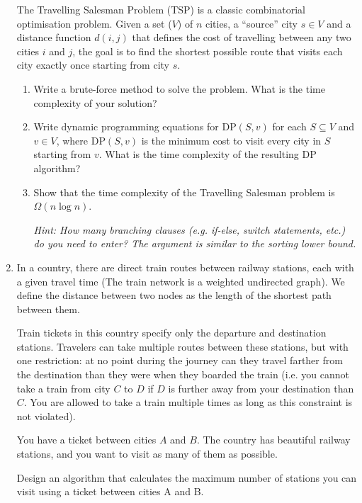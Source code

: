 \documentclass{article}
\begin{document}
\begin{enumerate}
The Travelling Salesman Problem (TSP) is a classic combinatorial optimisation problem. Given a set ($V$) of $n$ cities, a ``source'' city $s\in V$ and a distance function $d(i, j)$ that defines the cost of travelling between any two cities $i$ and $j$, the goal is to find the shortest possible route that visits each city exactly once starting from city $s$.
\begin{enumerate}
    \item Write a brute-force method to solve the problem. What is the time complexity of your solution?
    \item Write dynamic programming equations for $\mathrm{DP}(S,v)$ for each $S\subseteq V$ and $v \in V$, where $\mathrm{DP}(S,v)$ is the minimum  cost to visit every city in $S$ starting from $v$. What is the time complexity of the resulting DP algorithm?
    \item Show that the time complexity of the Travelling Salesman problem is $\Omega(n \log n)$. 

    \emph{ Hint: How many branching clauses (e.g. if-else, switch statements, etc.) do you need to enter? The argument is similar to the sorting lower bound.}
   
\end{enumerate}


    \item In a country, there are direct train routes between railway stations, each with a given travel time (The train network is a weighted undirected graph). We define the distance between two nodes as the length of the shortest path between them.

Train tickets in this country specify only the departure and destination stations. Travelers can take multiple routes between these stations, but with one restriction: at no point during the journey can they travel farther from the destination than they were when they boarded the train (i.e. you cannot take a train from city $C$ to $D$ if $D$ is further away from your destination than $C$. You are allowed to take a train multiple times as long as this constraint is not violated).

You have a ticket between cities $A$ and $B$. The country has beautiful railway stations, and you want to visit as many of them as possible.

Design an algorithm that calculates the maximum number of stations you can visit using a ticket between cities A and B.

\end{enumerate}
\end{document}
